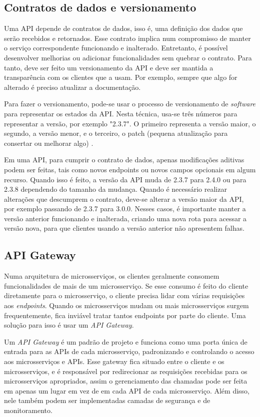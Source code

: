\subsection{Contratos de dados e versionamento}
Uma API depende de contratos de dados, isso é, uma definição dos dados que serão recebidos e retornados. Esse contrato implica num compromisso de manter o serviço correspondente funcionando e inalterado. Entretanto, é possível desenvolver melhorias ou adicionar funcionalidades sem quebrar o contrato. Para tanto, deve ser feito um versionamento da API e deve ser mantida a transparência com os clientes que a usam. Por exemplo, sempre que algo for alterado é preciso atualizar a documentação.

Para fazer o versionamento, pode-se usar o processo de versionamento de \emph{software} para representar os estados da API. Nesta técnica, usa-se três números para representar a versão, por exemplo "2.3.7". O primeiro representa a versão maior, o segundo, a versão menor, e o terceiro, o patch (pequena atualização para consertar ou melhorar algo) \cite{wiki_software_versioning_2022}.

Em uma API, para cumprir o contrato de dados, apenas modificações aditivas podem ser feitas, tais como novos endpoints ou novos campos opcionais em algum recurso. Quando isso é feito, a versão da API muda de 2.3.7 para 2.4.0 ou para 2.3.8 dependendo do tamanho da mudança. Quando é necessário realizar alterações que descumprem o contrato, deve-se alterar a versão maior da API, por exemplo passando de 2.3.7 para 3.0.0. Nesses casos, é importante manter a versão anterior funcionando e inalterada, criando uma nova rota para acessar a versão nova, para que clientes usando a versão anterior não apresentem falhas.

\subsection{API Gateway}\label{boas-praticas-api-gateway}
Numa arquitetura de microsserviços, os clientes geralmente consomem funcionalidades de mais de um microsserviço. Se esse consumo é feito do cliente diretamente para o microsserviço, o cliente precisa lidar com várias requisições aos \emph{endpoints}. Quando os microsserviços mudam ou mais microsserviços surgem frequentemente, fica inviável tratar tantos endpoints por parte do cliente. Uma solução para isso é usar um \emph{API Gateway}. 

Um \emph{API Gateway} é um padrão de projeto e funciona como uma porta única de entrada para as APIs de cada microsserviço, padronizando e controlando o acesso aos microsserviços e APIs. Esse gateway fica situado entre o cliente e os microsserviços, e é responsável por redirecionar as requisições recebidas para os microsserviços apropriados, assim o gerenciamento das chamadas pode ser feita em apenas um lugar em vez de em cada API de cada microsserviço. Além disso, nele também podem ser implementadas camadas de segurança e de monitoramento.


